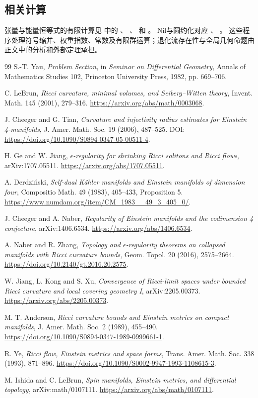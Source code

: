 \documentclass[UTF8,a4paper,11pt,fontset=fandol]{ctexart}
\numberwithin{equation}{section}
\theoremstyle{definition}
\begin{document}
\subsection{相关计算}
张量与能量恒等式的有限计算见
 中的
、
、
 和
。
Nil与圆约化对应
、
。
这些程序处理符号缩并、权重指数、常数及有限群运算；退化流存在性与全局几何命题由正文中的分析和外部定理承担。

\begin{thebibliography}{99}
 S.-T. Yau, \emph{Problem Section}, in \emph{Seminar on Differential Geometry}, Annals of Mathematics Studies 102, Princeton University Press, 1982, pp. 669--706.

 C. LeBrun, \emph{Ricci curvature, minimal volumes, and Seiberg--Witten theory}, Invent. Math. 145 (2001), 279--316. \url{https://arxiv.org/abs/math/0003068}.

 J. Cheeger and G. Tian, \emph{Curvature and injectivity radius estimates for Einstein 4-manifolds}, J. Amer. Math. Soc. 19 (2006), 487--525. DOI: \url{https://doi.org/10.1090/S0894-0347-05-00511-4}.

 H. Ge and W. Jiang, \emph{$\epsilon$-regularity for shrinking Ricci solitons and Ricci flows}, arXiv:1707.05511. \url{https://arxiv.org/abs/1707.05511}.

 A. Derdzi\'nski, \emph{Self-dual K\"ahler manifolds and Einstein manifolds of dimension four}, Compositio Math. 49 (1983), 405--433, Proposition 5. \url{https://www.numdam.org/item/CM_1983__49_3_405_0/}.

 J. Cheeger and A. Naber, \emph{Regularity of Einstein manifolds and the codimension 4 conjecture}, arXiv:1406.6534. \url{https://arxiv.org/abs/1406.6534}.

 A. Naber and R. Zhang, \emph{Topology and $\epsilon$-regularity theorems on collapsed manifolds with Ricci curvature bounds}, Geom. Topol. 20 (2016), 2575--2664. \url{https://doi.org/10.2140/gt.2016.20.2575}.

 W. Jiang, L. Kong and S. Xu, \emph{Convergence of Ricci-limit spaces under bounded Ricci curvature and local covering geometry I}, arXiv:2205.00373. \url{https://arxiv.org/abs/2205.00373}.

 M. T. Anderson, \emph{Ricci curvature bounds and Einstein metrics on compact manifolds}, J. Amer. Math. Soc. 2 (1989), 455--490. \url{https://doi.org/10.1090/S0894-0347-1989-0999661-1}.

 R. Ye, \emph{Ricci flow, Einstein metrics and space forms}, Trans. Amer. Math. Soc. 338 (1993), 871--896. \url{https://doi.org/10.1090/S0002-9947-1993-1108615-3}.

 M. Ishida and C. LeBrun, \emph{Spin manifolds, Einstein metrics, and differential topology}, arXiv:math/0107111. \url{https://arxiv.org/abs/math/0107111}.

\end{thebibliography}
\end{document}
